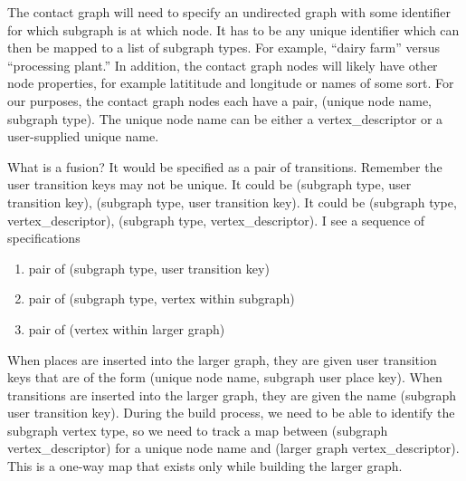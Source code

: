 \documentclass{article}
\begin{document}
The contact graph will need to specify an undirected graph with some
identifier for which subgraph is at which node. It has to be any
unique identifier which can then be mapped to a list of subgraph types.
For example, ``dairy farm'' versus ``processing plant.'' In addition, the
contact graph nodes will likely have other node properties, for example
latititude and longitude or names of some sort. For our purposes,
the contact graph nodes each have a pair, (unique node name, subgraph type).
The unique node name can be either a vertex\_descriptor or a user-supplied
unique name.

What is a fusion? It would be specified as a pair of transitions.
Remember the user transition keys may not be unique. It could be
(subgraph type, user transition key), (subgraph type, user transition key).
It could be (subgraph type, vertex\_descriptor),
(subgraph type, vertex\_descriptor). I see a sequence of specifications

\begin{enumerate}
  \item pair of (subgraph type, user transition key)
  \item pair of (subgraph type, vertex within subgraph)
  \item pair of (vertex within larger graph)
\end{enumerate}

When places are inserted into the larger graph, they are given user
transition keys that are of the form (unique node name, subgraph user place key).
When transitions are inserted into the larger graph, they are given the
name (subgraph user transition key). During the build process,
we need to be able to identify the subgraph vertex type, so we need to
track a map between (subgraph vertex\_descriptor) for a unique node name and
(larger graph vertex\_descriptor). This is a one-way map that exists
only while building the larger graph.
\end{document}
